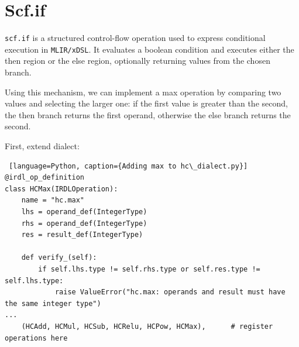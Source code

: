 \documentclass[../main.tex]{subfiles}
\begin{document}
\section{Scf.if}

\texttt{scf.if} is a structured control-flow operation used to
express conditional execution in \texttt{MLIR/xDSL}. It evaluates a boolean
condition and executes either the then region or the else region, optionally
returning values from the chosen branch.

Using this mechanism, we can implement a max operation by comparing two values
and selecting the larger one: if the first value is greater than the second,
the then branch returns the first operand,
otherwise the else branch returns the second.

First, extend dialect:
\begin{lstlisting} [language=Python, caption={Adding max to hc\_dialect.py}]
@irdl_op_definition
class HCMax(IRDLOperation):
    name = "hc.max"
    lhs = operand_def(IntegerType)
    rhs = operand_def(IntegerType)
    res = result_def(IntegerType)

    def verify_(self):
        if self.lhs.type != self.rhs.type or self.res.type != self.lhs.type:
            raise ValueError("hc.max: operands and result must have the same integer type")
...
    (HCAdd, HCMul, HCSub, HCRelu, HCPow, HCMax),      # register operations here
\end{lstlisting}
\end{document}
